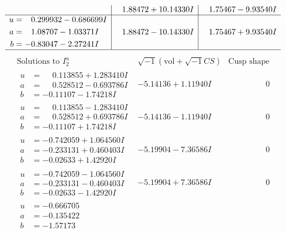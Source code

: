 \documentclass[1p]{elsarticle_modified}
\theoremstyle{definition}
\newcommand{\I}{\sqrt{-1}}
\begin{document}
$$\begin{array}{c|c|c}
 & \phantom{-}1.88472 + 10.14330 I & \phantom{-}1.75467 - 9.93540 I \\ \hline\begin{aligned}
u &= \phantom{-}0.299932 - 0.686699 I \\
a &= \phantom{-}1.08707 - 1.03371 I \\
b &= -0.83047 - 2.27241 I\end{aligned}
 & \phantom{-}1.88472 - 10.14330 I & \phantom{-}1.75467 + 9.93540 I\\
 \hline 
 \end{array}$$\newpage$$\begin{array}{c|c|c}  
\text{Solutions to }I^u_{2}& \I (\text{vol} + \sqrt{-1}CS) & \text{Cusp shape}\\
 \hline 
\begin{aligned}
u &= \phantom{-}0.113855 + 1.283410 I \\
a &= \phantom{-}0.528512 - 0.693786 I \\
b &= -0.11107 - 1.74218 I\end{aligned}
 & -5.14136 + 1.11940 I & \phantom{-0.000000 } 0 \\ \hline\begin{aligned}
u &= \phantom{-}0.113855 - 1.283410 I \\
a &= \phantom{-}0.528512 + 0.693786 I \\
b &= -0.11107 + 1.74218 I\end{aligned}
 & -5.14136 - 1.11940 I & \phantom{-0.000000 } 0 \\ \hline\begin{aligned}
u &= -0.742059 + 1.064560 I \\
a &= -0.233131 + 0.460403 I \\
b &= -0.02633 + 1.42920 I\end{aligned}
 & -5.19904 - 7.36586 I & \phantom{-0.000000 } 0 \\ \hline\begin{aligned}
u &= -0.742059 - 1.064560 I \\
a &= -0.233131 - 0.460403 I \\
b &= -0.02633 - 1.42920 I\end{aligned}
 & -5.19904 + 7.36586 I & \phantom{-0.000000 } 0 \\ \hline\begin{aligned}
u &= -0.666705\phantom{ +0.000000I} \\
a &= -0.135422\phantom{ +0.000000I} \\
b &= -1.57173\phantom{ +0.000000I}\end{aligned}

\end{array}$$
\end{document}

